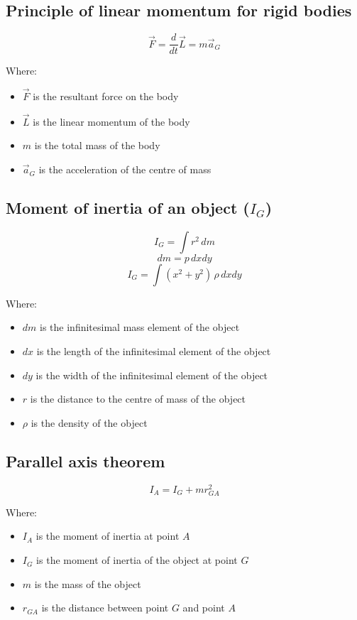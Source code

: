 \documentclass[11pt]{article}
\begin{document}
\subsection{Principle of linear momentum for rigid bodies}
\label{sec:orga22bbc5}
\[\vec{F} = \frac{d}{dt} \vec{L} = m \vec{a}_G\]

Where:
\begin{itemize}
\item \(\vec{F}\) is the resultant force on the body
\item \(\vec{L}\) is the linear momentum of the body
\item \(m\) is the total mass of the body
\item \(\vec{a}_G\) is the acceleration of the centre of mass
\end{itemize}

\subsection{Moment of inertia of an object (\(I_G\))}
\label{sec:orgfd5c31b}
\[I_G = \int r^2 \, dm\]
\[dm = p \, dx dy\]
\[I_G = \int (x^2 + y^2) \, \rho \, dx dy\]

Where:
\begin{itemize}
\item \(dm\) is the infinitesimal mass element of the object
\item \(dx\) is the length of the infinitesimal element of the object
\item \(dy\) is the width of the infinitesimal element of the object
\item \(r\) is the distance to the centre of mass of the object
\item \(\rho\) is the density of the object
\end{itemize}

\subsection{Parallel axis theorem}
\label{sec:org60285b4}
\[I_A = I_G + mr_{GA}^2\]

Where:
\begin{itemize}
\item \(I_A\) is the moment of inertia at point \(A\)
\item \(I_G\) is the moment of inertia of the object at point \(G\)
\item \(m\) is the mass of the object
\item \(r_{GA}\) is the distance between point \(G\) and point \(A\)
\end{itemize}
\end{document}
